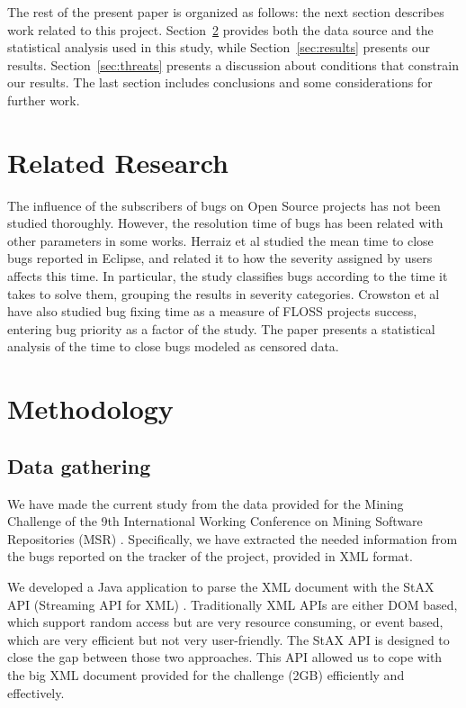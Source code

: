 \documentclass[10pt, conference, compsocconf]{IEEEtran}
\begin{document}
The rest of the present paper is organized as follows: the next section describes work related to this project. Section~\ref{sec:methodology} provides both the data source and the statistical analysis used in this study, while Section~\ref{sec:results} presents our results. Section~\ref{sec:threats} presents a discussion about conditions that constrain our results. The last section includes conclusions and some considerations for further work.

\section{Related Research}
The influence of the subscribers of bugs on Open Source projects has not been studied thoroughly. However, the resolution time of bugs has been related with other parameters in some works. Herraiz et al \cite{EclipseSimplification} studied the mean time to close bugs reported in Eclipse, and related it to how the severity assigned by users affects this time. In particular, the study classifies bugs according to the time it takes to solve them, grouping the results in severity categories. Crowston et al \cite{Portfolio} have also studied bug fixing time as a measure of FLOSS projects success, entering bug priority as a factor of the study. The paper presents a statistical analysis of the time to close bugs modeled as censored data.

\section{Methodology}
\label{sec:methodology}
\subsection {Data gathering}
We have made the current study from the data provided for the Mining Challenge of the 9th International Working Conference on Mining Software Repositories (MSR) \cite{MSR}. Specifically, we have extracted the needed information from the bugs reported on the tracker of the project, provided in XML format.

We developed a Java application to parse the XML document with the StAX API (Streaming API for XML) \cite{StAX}. Traditionally XML APIs are either DOM based, which support random access but are very resource consuming, or event based, which are very efficient but not very user-friendly. The StAX API is designed to close the gap between those two approaches. This API allowed us to cope with the big XML document provided for the challenge (2GB) efficiently and effectively.
\end{document}
